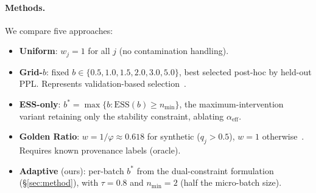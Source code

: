 \paragraph{Methods.}
We compare five approaches:
\begin{itemize}[nosep,leftmargin=*]
  \item \textbf{Uniform}: $w_j = 1$ for all $j$ (no contamination handling).
  \item \textbf{Grid-$b$}: fixed $b \in \{0.5, 1.0, 1.5, 2.0, 3.0, 5.0\}$, best selected post-hoc by held-out PPL.
        Represents validation-based selection~\citep{drayson_2025_detection_collapse}.
  \item \textbf{ESS-only}: $b^* = \max\{b : \mathrm{ESS}(b) \geq n_{\min}\}$, the maximum-intervention variant retaining only the stability constraint, ablating $\alpha_{\mathrm{eff}}$.
  \item \textbf{Golden Ratio}: $w = 1/\varphi \approx 0.618$ for synthetic ($q_j > 0.5$), $w = 1$ otherwise~\citep{he_2025_golden_ratio}.
        Requires known provenance labels (oracle).
  \item \textbf{Adaptive} (ours): per-batch $b^*$ from the dual-constraint formulation (\S\ref{sec:method}), with $\tau = 0.8$ and $n_{\min} = 2$ (half the micro-batch size).
\end{itemize}
